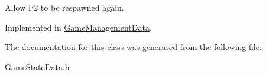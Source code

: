 Allow P2 to be respawned again. 



Implemented in \hyperlink{classGameManagementData_a31113c80e1caa2604c98db63d565641a}{Game\-Management\-Data}.



The documentation for this class was generated from the following file\-:\begin{DoxyCompactItemize}
\item 
\hyperlink{GameStateData_8h}{Game\-State\-Data.\-h}\end{DoxyCompactItemize}
